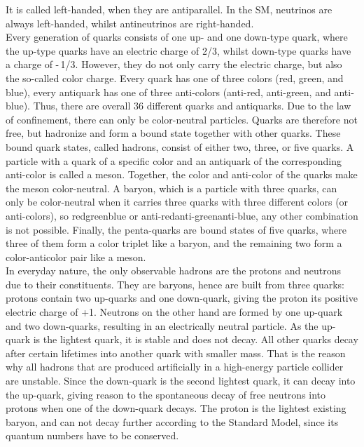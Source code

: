 It is called left-handed, when they are antiparallel.
In the SM, neutrinos are always left-handed, whilst antineutrinos are right-handed.\\
Every generation of quarks consists of one up- and one down-type quark, where the up-type quarks have an electric charge of 2/3, whilst down-type quarks have a charge of -\,1/3.
However, they do not only carry the electric charge, but also the so-called color charge.
Every quark has one of three colors (red, green, and blue), every antiquark has one of three anti-colors (anti-red, anti-green, and anti-blue).
Thus, there are overall 36 different quarks and antiquarks.
Due to the law of confinement, there can only be color-neutral particles.
Quarks are therefore not free, but hadronize and form a bound state together with other quarks.
These bound quark states, called hadrons, consist of either two, three, or five quarks.
A particle with a quark of a specific color and an antiquark of the corresponding anti-color is called a meson.
Together, the color and anti-color of the quarks make the meson color-neutral.
A baryon, which is a particle with three quarks, can only be color-neutral when it carries three quarks with three different colors (or anti-colors), so red\textendash green\textendash blue or anti-red\textendash anti-green\textendash anti-blue, any other combination is not possible.
Finally, the penta-quarks are bound states of five quarks, where three of them form a color triplet like a baryon, and the remaining two form a color-anticolor pair like a meson.\\
In everyday nature, the only observable hadrons are the protons and neutrons due to their constituents.
They are baryons, hence are built from three quarks:
protons contain two up-quarks and one down-quark, giving the proton its positive electric charge of +1.
Neutrons on the other hand are formed by one up-quark and two down-quarks, resulting in an electrically neutral particle. 
As the up-quark is the lightest quark, it is stable and does not decay.
All other quarks decay after certain lifetimes into another quark with smaller mass.
That is the reason why all hadrons that are produced artificially in a high-energy particle collider are unstable.
Since the down-quark is the second lightest quark, it can decay into the up-quark, giving reason to the spontaneous decay of free neutrons into protons when one of the down-quark decays.
The proton is the lightest existing baryon, and can not decay further according to the Standard Model, since its quantum numbers have to be conserved.
